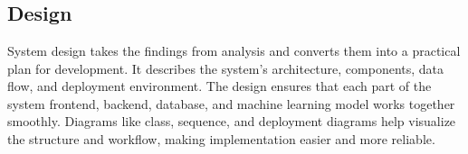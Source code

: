 \section*{\Large{}}
\label{4}
\subsection{Design}
System design takes the findings from analysis and converts them into a practical plan for development. It describes the system’s architecture, components, data flow, and deployment environment. The design ensures that each part of the system frontend, backend, database, and machine learning model works together smoothly. Diagrams like class, sequence, and deployment diagrams help visualize the structure and workflow, making implementation easier and more reliable.
